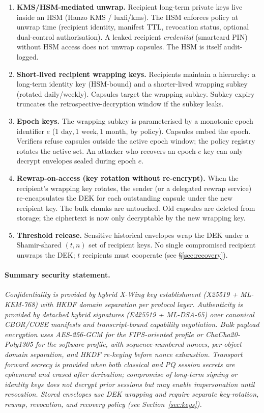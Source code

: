 \documentclass[11pt,a4paper]{article}
\begin{document}
\begin{enumerate}[leftmargin=*,itemsep=0pt]
\item \textbf{KMS/HSM-mediated unwrap.} Recipient long-term private
  keys live inside an HSM (Hanzo KMS / luxfi/kms). The HSM enforces
  policy at unwrap time (recipient identity, manifest TTL,
  revocation status, optional dual-control authorisation). A leaked
  recipient \emph{credential} (smartcard PIN) without HSM access
  does not unwrap capsules. The HSM is itself audit-logged.
\item \textbf{Short-lived recipient wrapping keys.} Recipients
  maintain a hierarchy: a long-term identity key (HSM-bound) and a
  shorter-lived wrapping subkey (rotated daily/weekly). Capsules
  target the wrapping subkey. Subkey expiry truncates the
  retrospective-decryption window if the subkey leaks.
\item \textbf{Epoch keys.} The wrapping subkey is parameterised by a
  monotonic epoch identifier $e$ ($1\text{ day}, 1\text{ week},
  1\text{ month}$, by policy). Capsules embed the epoch. Verifiers
  refuse capsules outside the active epoch window; the policy
  registry rotates the active set. An attacker who recovers an
  epoch-$e$ key can only decrypt envelopes sealed during epoch $e$.
\item \textbf{Rewrap-on-access (key rotation without re-encrypt).}
  When the recipient's wrapping key rotates, the sender (or a
  delegated rewrap service) re-encapsulates the DEK for each
  outstanding capsule under the new recipient key. The bulk chunks
  are untouched. Old capsules are deleted from storage; the
  ciphertext is now only decryptable by the new wrapping key.
\item \textbf{Threshold release.} Sensitive historical envelopes
  wrap the DEK under a Shamir-shared $(t, n)$ set of recipient
  keys. No single compromised recipient unwraps the DEK; $t$
  recipients must cooperate (see §\ref{sec:recovery}).
\end{enumerate}

\paragraph{Summary security statement.}
\emph{Confidentiality is provided by hybrid X-Wing key
establishment (X25519 + ML-KEM-768) with HKDF domain separation per
protocol layer. Authenticity is provided by detached hybrid
signatures (Ed25519 + ML-DSA-65) over canonical CBOR/COSE manifests
and transcript-bound capability negotiation. Bulk payload encryption
uses AES-256-GCM for the FIPS-oriented profile or ChaCha20-Poly1305
for the software profile, with sequence-numbered nonces, per-object
domain separation, and HKDF re-keying before nonce exhaustion.
Transport forward secrecy is provided when both classical and PQ
session secrets are ephemeral and erased after derivation; compromise
of long-term signing or identity keys does not decrypt prior sessions
but may enable impersonation until revocation. Stored envelopes use
DEK wrapping and require separate key-rotation, rewrap, revocation,
and recovery policy (see Section~\ref{sec:keys}).}
\end{document}
